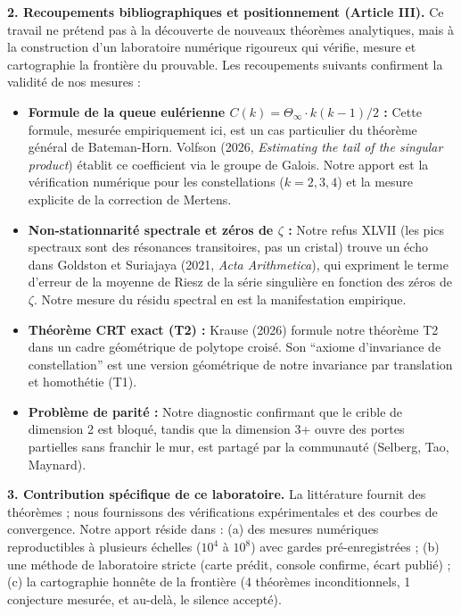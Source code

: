 \documentclass[11pt,a4paper]{article}
\begin{document}
\textbf{2. Recoupements bibliographiques et positionnement (Article III).}  
Ce travail ne prétend pas à la découverte de nouveaux théorèmes analytiques, mais à la construction d'un laboratoire numérique rigoureux qui vérifie, mesure et cartographie la frontière du prouvable. Les recoupements suivants confirment la validité de nos mesures :
\begin{itemize}
\item \textbf{Formule de la queue eulérienne $C(k) = \Theta_\infty \cdot k(k-1)/2$ :} Cette formule, mesurée empiriquement ici, est un cas particulier du théorème général de Bateman-Horn. Volfson (2026, \emph{Estimating the tail of the singular product}) établit ce coefficient via le groupe de Galois. Notre apport est la vérification numérique pour les constellations ($k=2,3,4$) et la mesure explicite de la correction de Mertens.
\item \textbf{Non-stationnarité spectrale et zéros de $\zeta$ :} Notre refus XLVII (les pics spectraux sont des résonances transitoires, pas un cristal) trouve un écho dans Goldston et Suriajaya (2021, \emph{Acta Arithmetica}), qui expriment le terme d'erreur de la moyenne de Riesz de la série singulière en fonction des zéros de $\zeta$. Notre mesure du résidu spectral en est la manifestation empirique.
\item \textbf{Théorème CRT exact (T2) :} Krause (2026) formule notre théorème T2 dans un cadre géométrique de polytope croisé. Son ``axiome d'invariance de constellation'' est une version géométrique de notre invariance par translation et homothétie (T1).
\item \textbf{Problème de parité :} Notre diagnostic confirmant que le crible de dimension 2 est bloqué, tandis que la dimension 3+ ouvre des portes partielles sans franchir le mur, est partagé par la communauté (Selberg, Tao, Maynard).
\end{itemize}

\textbf{3. Contribution spécifique de ce laboratoire.}  
La littérature fournit des théorèmes ; nous fournissons des vérifications expérimentales et des courbes de convergence. Notre apport réside dans : (a) des mesures numériques reproductibles à plusieurs échelles ($10^4$ à $10^8$) avec gardes pré-enregistrées ; (b) une méthode de laboratoire stricte (carte prédit, console confirme, écart publié) ; (c) la cartographie honnête de la frontière (4 théorèmes inconditionnels, 1 conjecture mesurée, et au-delà, le silence accepté).
\end{document}
